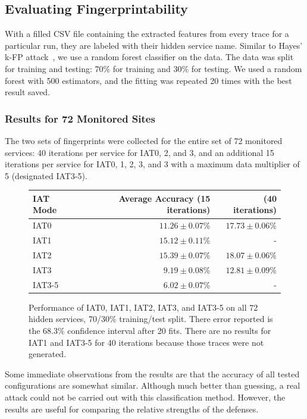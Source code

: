 \documentclass[11pt]{article}
\begin{document}
\subsection{Evaluating Fingerprintability}
With a filled CSV file containing the extracted features from every trace for a particular run, they are labeled with their hidden service name. Similar to Hayes' k-FP attack~\cite{hayes}, we use a random forest classifier on the data. The data was split for training and testing: 70\% for training and 30\% for testing. We used a random forest with 500 estimators, and the fitting was repeated 20 times with the best result saved.

\subsubsection{Results for 72 Monitored Sites}
The two sets of fingerprints were collected for the entire set of 72 monitored services: 40 iterations per service for IAT0, 2, and 3, and an additional 15 iterations per service for IAT0, 1, 2, 3, and 3 with a maximum data multiplier of 5 (designated IAT3-5).

\begin{figure}[ht]
    \centering
    \begin{tabular}{|l|r|r|}
        \hline
        IAT Mode & Average Accuracy (15 iterations) & (40 iterations) \\
        \hline
        IAT0  & $11.26 \pm 0.07$\% & $17.73 \pm 0.06$\%\\
        IAT1  & $15.12 \pm 0.11$\% & -\\
        IAT2  & $15.39 \pm 0.07$\% & $18.07 \pm 0.06$\%\\
        IAT3  & $ 9.19 \pm 0.08$\% & $12.81 \pm 0.09$\%\\
        IAT3-5& $ 6.02 \pm 0.07$\% & -\\
        \hline
    \end{tabular}
    \caption[]{Performance of IAT0, IAT1, IAT2, IAT3, and IAT3-5 on all 72 hidden services, 70/30\% training/test split. There error reported is the 68.3\% confidence interval after 20 fits. There are no results for IAT1 and IAT3-5 for 40 iterations because those traces were not generated.}
\end{figure}

Some immediate observations from the results are that the accuracy of all tested configurations are somewhat similar. Although much better than guessing, a real attack could not be carried out with this classification method. However, the results are useful for comparing the relative strengths of the defenses.
\end{document}

